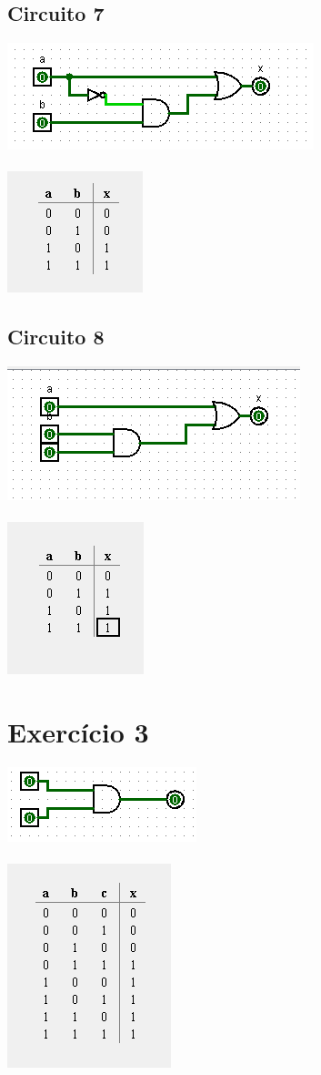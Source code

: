 \documentclass[12pt]{article}
\begin{document}
\subsection{Circuito 7}
    \includegraphics{./images/circuito07.png}\\
    \\\includegraphics{./images/circuito06_table.png}
\subsection{Circuito 8}
    \includegraphics{./images/circuito08.png}\\
    \\\includegraphics{./images/circuito07_table.png}
\section{Exercício 3}
    \includegraphics{./images/circuito09.png}\\
    \\\includegraphics{./images/circuito08_table.png}
\end{document}
